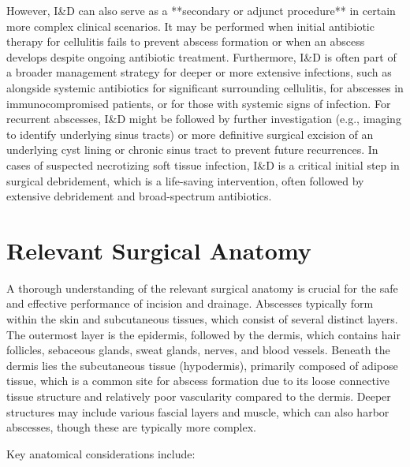 However, I\&D can also serve as a **secondary or adjunct procedure** in certain more complex clinical scenarios. It may be performed when initial antibiotic therapy for cellulitis fails to prevent abscess formation or when an abscess develops despite ongoing antibiotic treatment. Furthermore, I\&D is often part of a broader management strategy for deeper or more extensive infections, such as alongside systemic antibiotics for significant surrounding cellulitis, for abscesses in immunocompromised patients, or for those with systemic signs of infection. For recurrent abscesses, I\&D might be followed by further investigation (e.g., imaging to identify underlying sinus tracts) or more definitive surgical excision of an underlying cyst lining or chronic sinus tract to prevent future recurrences. In cases of suspected necrotizing soft tissue infection, I\&D is a critical initial step in surgical debridement, which is a life-saving intervention, often followed by extensive debridement and broad-spectrum antibiotics.

\section*{Relevant Surgical Anatomy}
A thorough understanding of the relevant surgical anatomy is crucial for the safe and effective performance of incision and drainage. Abscesses typically form within the skin and subcutaneous tissues, which consist of several distinct layers. The outermost layer is the epidermis, followed by the dermis, which contains hair follicles, sebaceous glands, sweat glands, nerves, and blood vessels. Beneath the dermis lies the subcutaneous tissue (hypodermis), primarily composed of adipose tissue, which is a common site for abscess formation due to its loose connective tissue structure and relatively poor vascularity compared to the dermis. Deeper structures may include various fascial layers and muscle, which can also harbor abscesses, though these are typically more complex.

Key anatomical considerations include:

